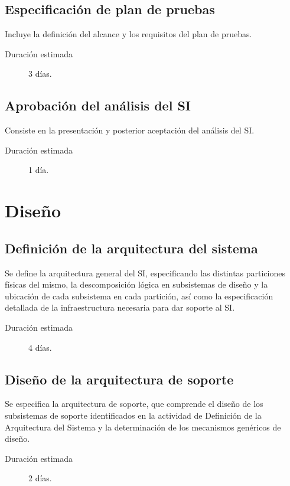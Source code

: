 \documentclass[11pt,a4paper,spanish,twoside]{report}
\begin{document}
\subsection{Especificación de plan de pruebas}
Incluye la definición del alcance y los requisitos del plan de pruebas.
\begin{description}
\item[Duración estimada] 3 días.
\end{description}

\subsection{Aprobación del análisis del SI}
Consiste en la presentación y posterior aceptación del
    análisis del SI.
\begin{description}
\item[Duración estimada] 1 día.
\end{description}

\section{Diseño}
\subsection{Definición de la arquitectura del sistema}
Se define la arquitectura general del SI, especificando las distintas
particiones físicas del mismo, la descomposición lógica en subsistemas de
diseño y la ubicación de cada subsistema en cada partición, así como la
especificación detallada de la infraestructura necesaria para dar soporte al
SI. 
\begin{description}
\item[Duración estimada] 4 días.
\end{description}

\subsection{Diseño de la arquitectura de soporte}
Se especifica la arquitectura de soporte, que comprende el diseño de los
subsistemas de soporte identificados en la actividad de Definición de la
Arquitectura del Sistema y la determinación de los mecanismos genéricos de
diseño.
\begin{description}
\item[Duración estimada] 2 días.
\end{description}
\end{document}
